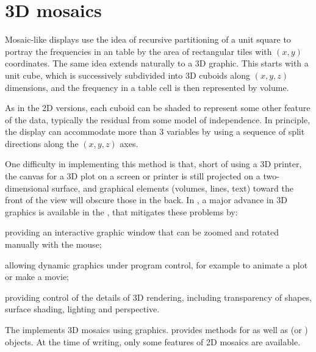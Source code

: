 \documentclass[10pt,krantz2]{krantz}\usepackage[]{graphicx}\usepackage[]{color}
\begin{document}
\section{3D mosaics}\label{sec:3D}

Mosaic-like displays use the idea of recursive partitioning of a unit square to
portray the frequencies in an \nway table by the area of rectangular tiles
with $(x, y)$ coordinates.
The same idea extends naturally to a 3D graphic.  This starts with a unit cube,
which is successively subdivided into 3D cuboids along $(x, y, z)$ dimensions,
and the frequency in a table cell is then represented by volume.

As in the 2D versions, each cuboid can be shaded to represent some other
feature of the data, typically the residual from some model of independence.
In principle, the display can accommodate more than 3 variables by
using a sequence of split directions along the $(x, y, z)$ axes.

One difficulty in implementing this method is that, short of using a 3D printer,
the canvas for a 3D plot on a screen or printer is still projected
on a two-dimensional surface, and graphical elements (volumes, lines, text)
toward the front of the view will obscure those in the back.
In \R, a major advance in 3D graphics is available in the ,
that mitigates these problems by:
\begin{seriate}
 \item providing an interactive graphic window that can be zoomed and rotated
 manually with the mouse;
 \item allowing dynamic graphics under program control, for example to animate
 a plot or make a movie;
 \item providing control of the details of 3D rendering, including transparency
 of shapes, surface shading, lighting and perspective.
\end{seriate}

The  implements 3D mosaics using  graphics.
 provides methods for 
as well as  (or ) objects.
At the time of writing, only some features of 2D mosaics are available.
\end{document}
